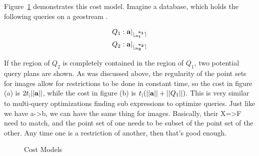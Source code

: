 \documentclass{vldb}
\begin{document}
\begin{figure}[htbp]
  \centering
\end{figure}


Figure~\ref{fig:cost} demonstrates this cost model.  Imagine a
database, which holds the following queries on a geostream .

\begin{align}
  Q_1 &: {\bf{a}}|_{\lfloor_{{\bf{{\ensuremath{\bf{n_1}}}}}}^{\;\;{\bf{{\ensuremath{\bf{x_1}}}}}}\rceil} \\
  Q_2 &: {\bf{a}}|_{\lfloor_{{\bf{{\ensuremath{\bf{n_2}}}}}}^{\;\;{\bf{{\ensuremath{\bf{x_2}}}}}}\rceil}
\end{align}

If the region of $Q_2$ is completely contained in the region of $Q_1$,
two potential query plans are shown.  As was discussed above, the
regularity of the point sets for images allow for restrictions to be
done in constant time, so the cost in figure (a) is
$2t_{|}||{\bf{a}}||$, while the cost in figure (b) is
$t_{|}(||{\bf{a}}||+||Q_1||)$.  This is very similar to multi-query
optimizations finding sub expressions to optimize queries.  Just like
we have a->b, we can have the same thing for images.  Basically, their
X=>F need to match, and the point set of one needs to be subset of the
point set of the other.  Any time one is a restriction of another, then
that's good enough.

\begin{figure}[htbp]
  \centering
  \caption{Cost Models}
  \label{fig:cost}
\end{figure}
\end{document}
